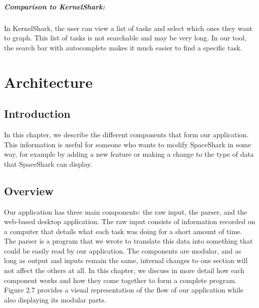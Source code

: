 \documentclass{hmcclinic}
\begin{document}
\paragraph{Comparison to KernelShark:}
    In KernelShark, the user can view a list of tasks and select which ones they
    want to graph.  This list of tasks is not searchable and may be very long.
    In our tool, the search bar with autocomplete makes it much easier to find a
    specific task.

\chapter{Architecture}

\section{Introduction}
In this chapter, we describe the different components that form our application.
This information is useful for someone who wants to modify SpaceShark in some
way, for example by adding a new feature or making a change to the type of data that SpaceShark can display.

\section{Overview}

  Our application has three main components: the raw input, the parser,
  and the web-based desktop application. The raw input consists of information recorded on a computer that details what each task was doing for a short amount of time. The parser is a program that we wrote to translate this data into something that could be easily read by our application. The components are modular, and
  as long as output and inputs remain the same, internal changes to one section will
  not affect the others at all. In this chapter, we  discuss in more detail how each
  component works and how they come together to form a complete program.
  Figure 2.7 provides a visual representation of the flow of our application
  while also displaying its modular parts.
  
\end{document}

